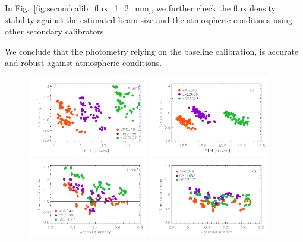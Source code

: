 In Fig.~\ref{fig:secondcalib_flux_1_2_mm}, we further check the flux density stability against
the estimated beam size and the atmospheric conditions using other secondary calibrators.


We conclude that the photometry relying on the baseline
calibration, is accurate and robust against atmospheric
conditions.


\begin{figure}[ht!]
  \begin{center}
    \includegraphics[clip=true,width=0.47\textwidth]{Figures/Calibration/plot_flux_density_ratio_3sources_FWHM_secondary_1mm.pdf}
    \includegraphics[clip=true,width=0.47\textwidth]{Figures/Calibration/plot_flux_density_ratio_3sources_FWHM_secondary_a2.pdf}
    \includegraphics[clip=true,width=0.47\textwidth]{Figures/Calibration/plot_flux_density_ratio_3sources_obstau_secondary_1mm.pdf}
    \includegraphics[clip=true,width=0.47\textwidth]{Figures/Calibration/plot_flux_density_ratio_3sources_obstau_secondary_a2.pdf}

\end{center}
\end{figure}
